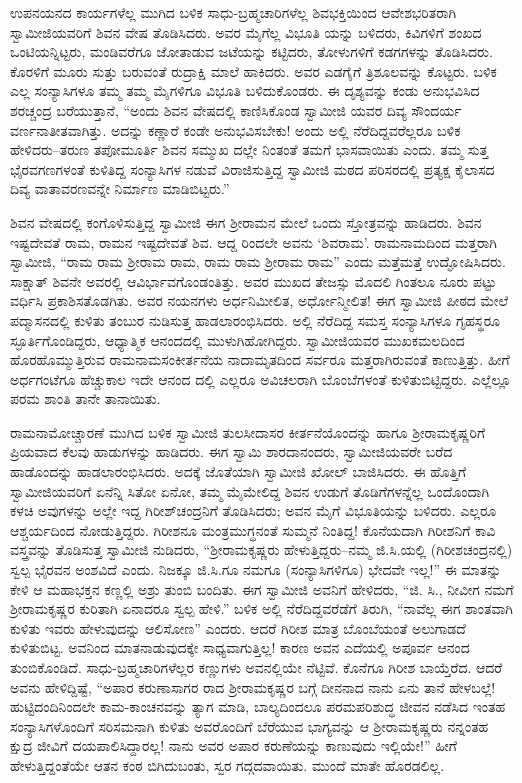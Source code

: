 ಉಪನಯನದ ಕಾರ್ಯಗಳೆಲ್ಲ ಮುಗಿದ ಬಳಿಕ ಸಾಧು-ಬ್ರಹ್ಮಚಾರಿಗಳೆಲ್ಲ ಶಿವಭಕ್ತಿಯಿಂದ ಆವೇಶಭರಿತರಾಗಿ ಸ್ವಾಮೀಜಿಯವರಿಗೆ ಶಿವನ ವೇಷ ತೊಡಿಸಿದರು. ಅವರ ಮೈಗೆಲ್ಲ ವಿಭೂತಿ ಯನ್ನು ಬಳಿದರು, ಕಿವಿಗಳಿಗೆ ಶಂಖದ ಒಂಟಿಯನ್ನಿಟ್ಟರು, ಮಂಡಿವರೆಗೂ ಜೋತಾಡುವ ಜಟೆಯನ್ನು ಕಟ್ಟಿದರು, ತೋಳುಗಳಿಗೆ ಕಡಗಗಳನ್ನು ತೊಡಿಸಿದರು. ಕೊರಳಿಗೆ ಮೂರು ಸುತ್ತು ಬರುವಂತೆ ರುದ್ರಾಕ್ಷಿ ಮಾಲೆ ಹಾಕಿದರು. ಅವರ ಎಡಗೈಗೆ ತ್ರಿಶೂಲವನ್ನು ಕೊಟ್ಟರು. ಬಳಿಕ ಎಲ್ಲ ಸಂನ್ಯಾಸಿಗಳೂ ತಮ್ಮ ತಮ್ಮ ಮೈಗಳಿಗೂ ವಿಭೂತಿ ಬಳಿದುಕೊಂಡರು. ಈ ದೃಶ್ಯವನ್ನು ಕಂಡು ಅನುಭವಿಸಿದ ಶರಚ್ಚಂದ್ರ ಬರೆಯುತ್ತಾನೆ, “ಅಂದು ಶಿವನ ವೇಷದಲ್ಲಿ ಕಾಣಿಸಿಕೊಂಡ ಸ್ವಾಮೀಜಿ ಯವರ ದಿವ್ಯ ಸೌಂದರ್ಯ ವರ್ಣನಾತೀತವಾಗಿತ್ತು. ಅದನ್ನು ಕಣ್ಣಾರೆ ಕಂಡೇ ಅನುಭವಿಸಬೇಕು! ಅಂದು ಅಲ್ಲಿ ನೆರೆದಿದ್ದವರೆಲ್ಲರೂ ಬಳಿಕ ಹೇಳಿದರು–ತರುಣ ತಪೋಮೂರ್ತಿ ಶಿವನ ಸಮ್ಮುಖ ದಲ್ಲೇ ನಿಂತಂತೆ ತಮಗೆ ಭಾಸವಾಯಿತು ಎಂದು. ತಮ್ಮ ಸುತ್ತ ಭೈರವಗಣಗಳಂತೆ ಕುಳಿತಿದ್ದ ಸಂನ್ಯಾಸಿಗಳ ನಡುವೆ ವಿರಾಜಿಸುತ್ತಿದ್ದ ಸ್ವಾಮೀಜಿ ಮಠದ ಪರಿಸರದಲ್ಲಿ ಪ್ರತ್ಯಕ್ಷ ಕೈಲಾಸದ ದಿವ್ಯ ವಾತಾವರಣವನ್ನೇ ನಿರ್ಮಾಣ ಮಾಡಿಬಿಟ್ಟರು.”

ಶಿವನ ವೇಷದಲ್ಲಿ ಕಂಗೊಳಿಸುತ್ತಿದ್ದ ಸ್ವಾಮೀಜಿ ಈಗ ಶ್ರೀರಾಮನ ಮೇಲೆ ಒಂದು ಸ್ತೋತ್ರವನ್ನು ಹಾಡಿದರು. ಶಿವನ ಇಷ್ಟದೇವತೆ ರಾಮ, ರಾಮನ ಇಷ್ಟದೇವತೆ ಶಿವ. ಆದ್ದ ರಿಂದಲೇ ಅವನು ‘ಶಿವರಾಮ’. ರಾಮನಾಮದಿಂದ ಮತ್ತರಾಗಿ ಸ್ವಾಮೀಜಿ, “ರಾಮ ರಾಮ ಶ್ರೀರಾಮ ರಾಮ, ರಾಮ ರಾಮ ಶ್ರೀರಾಮ ರಾಮ” ಎಂದು ಮತ್ತೆಮತ್ತೆ ಉದ್ಘೋಷಿಸಿದರು. ಸಾಕ್ಷಾತ್ ಶಿವನೇ ಅವರಲ್ಲಿ ಆವಿರ್ಭಾವಗೊಂಡಂತಿತ್ತು. ಅವರ ಮುಖದ ತೇಜಸ್ಸು ಮೊದಲಿ ಗಿಂತಲೂ ನೂರು ಪಟ್ಟು ವರ್ಧಿಸಿ ಪ್ರಕಾಶಿಸತೊಡಗಿತು. ಅವರ ನಯನಗಳು ಅರ್ಧನಿಮೀಲಿತ, ಅರ್ಧೋನ್ಮೀಲಿತ! ಈಗ ಸ್ವಾಮೀಜಿ ಪೀಠದ ಮೇಲೆ ಪದ್ಮಾಸನದಲ್ಲಿ ಕುಳಿತು ತಂಬುರ ನುಡಿಸುತ್ತ ಹಾಡಲಾರಂಭಿಸಿದರು. ಅಲ್ಲಿ ನೆರೆದಿದ್ದ ಸಮಸ್ತ ಸಂನ್ಯಾಸಿಗಳೂ ಗೃಹಸ್ಥರೂ ಸ್ಫೂರ್ತಿಗೊಂಡಿದ್ದರು, ಆಧ್ಯಾತ್ಮಿಕ ಆನಂದದಲ್ಲಿ ಮುಳುಗಿಹೋಗಿದ್ದರು. ಸ್ವಾಮೀಜಿಯವರ ಮುಖಕಮಲದಿಂದ ಹೊರಹೊಮ್ಮುತ್ತಿರುವ ರಾಮನಾಮಸಂಕೀರ್ತನೆಯ ನಾದಾಮೃತದಿಂದ ಸರ್ವರೂ ಮತ್ತರಾಗಿರುವಂತೆ ಕಾಣುತ್ತಿತ್ತು. ಹೀಗೆ ಅರ್ಧಗಂಟೆಗೂ ಹೆಚ್ಚುಕಾಲ ಇದೇ ಆನಂದ ದಲ್ಲಿ ಎಲ್ಲರೂ ಅವಿಚಲರಾಗಿ ಬೊಂಬೆಗಳಂತೆ ಕುಳಿತುಬಿಟ್ಟಿದ್ದರು. ಎಲ್ಲೆಲ್ಲೂ ಪರಮ ಶಾಂತಿ ತಾನೇ ತಾನಾಯಿತು.

ರಾಮನಾಮೋಚ್ಚಾರಣೆ ಮುಗಿದ ಬಳಿಕ ಸ್ವಾಮೀಜಿ ತುಲಸೀದಾಸರ ಕೀರ್ತನೆಯೊಂದನ್ನು ಹಾಗೂ ಶ್ರೀರಾಮಕೃಷ್ಣರಿಗೆ ಪ್ರಿಯವಾದ ಕೆಲವು ಹಾಡುಗಳನ್ನು ಹಾಡಿದರು. ಈಗ ಸ್ವಾಮಿ ಶಾರದಾನಂದರು, ಸ್ವಾಮೀಜಿಯವರೇ ಬರೆದ ಹಾಡೊಂದನ್ನು ಹಾಡಲಾರಂಭಿಸಿದರು. ಅದಕ್ಕೆ ಜೊತೆಯಾಗಿ ಸ್ವಾಮೀಜಿ ಖೋಲ್ ಬಾಜಿಸಿದರು. ಈ ಹೊತ್ತಿಗೆ ಸ್ವಾಮೀಜಿಯವರಿಗೆ ಏನೆನ್ನಿ ಸಿತೋ ಏನೋ, ತಮ್ಮ ಮೈಮೇಲಿದ್ದ ಶಿವನ ಉಡುಗೆ ತೊಡಿಗೆಗಳನ್ನೆಲ್ಲ ಒಂದೊಂದಾಗಿ ಕಳಚಿ ಅವುಗಳನ್ನು ಅಲ್ಲೇ ಇದ್ದ ಗಿರೀಶ್​ಚಂದ್ರನಿಗೆ ತೊಡಿಸಿದರು; ಅವನ ಮೈಗೆ ವಿಭೂತಿಯನ್ನು ಬಳಿದರು. ಎಲ್ಲರೂ ಆಶ್ಚರ್ಯದಿಂದ ನೋಡುತ್ತಿದ್ದರು. ಗಿರೀಶನೂ ಮಂತ್ರಮುಗ್ಧನಂತೆ ಸುಮ್ಮನೆ ನಿಂತಿದ್ದ! ಕೊನೆಯದಾಗಿ ಗಿರೀಶನಿಗೆ ಕಾವಿ ವಸ್ತ್ರವನ್ನು ತೊಡಿಸುತ್ತ ಸ್ವಾಮೀಜಿ ನುಡಿದರು, “ಶ್ರೀರಾಮಕೃಷ್ಣರು ಹೇಳುತ್ತಿದ್ದರು–ನಮ್ಮ ಜಿ.ಸಿ.ಯಲ್ಲಿ (ಗಿರೀಶಚಂದ್ರನಲ್ಲಿ) ಸ್ವಲ್ಪ ಭೈರವನ ಅಂಶವಿದೆ ಎಂದು. ನಿಜಕ್ಕೂ ಜಿ.ಸಿ.ಗೂ ನಮಗೂ (ಸಂನ್ಯಾಸಿಗಳಿಗೂ) ಭೇದವೇ ಇಲ್ಲ!” ಈ ಮಾತನ್ನು ಕೇಳಿ ಆ ಮಹಾಭಕ್ತನ ಕಣ್ಣಲ್ಲಿ ಅಶ್ರು ತುಂಬಿ ಬಂದಿತು. ಈಗ ಸ್ವಾಮೀಜಿ ಅವನಿಗೆ ಹೇಳಿದರು, “ಜಿ. ಸಿ., ನೀವೀಗ ನಮಗೆ ಶ್ರೀರಾಮಕೃಷ್ಣರ ಕುರಿತಾಗಿ ಏನಾದರೂ ಸ್ವಲ್ಪ ಹೇಳಿ.” ಬಳಿಕ ಅಲ್ಲಿ ನೆರೆದಿದ್ದವರೆಡೆಗೆ ತಿರುಗಿ, “ನಾವೆಲ್ಲ ಈಗ ಶಾಂತವಾಗಿ ಕುಳಿತು ಇವರು ಹೇಳುವುದನ್ನು ಆಲಿಸೋಣ” ಎಂದರು. ಆದರೆ ಗಿರೀಶ ಮಾತ್ರ ಬೊಂಬೆಯಂತೆ ಅಲುಗಾಡದೆ ಕುಳಿತುಬಿಟ್ಟ. ಅವನಿಂದ ಮಾತನಾಡುವುದಕ್ಕೇ ಸಾಧ್ಯವಾಗುತ್ತಿಲ್ಲ! ಕಾರಣ ಅವನ ಎದೆಯಲ್ಲಿ ಅಪೂರ್ವ ಆನಂದ ತುಂಬಿಕೊಂಡಿದೆ. ಸಾಧು-ಬ್ರಹ್ಮಚಾರಿಗಳೆಲ್ಲರ ಕಣ್ಣುಗಳು ಅವನಲ್ಲಿಯೇ ನೆಟ್ಟಿವೆ. ಕೊನೆಗೂ ಗಿರೀಶ ಬಾಯ್ತೆರೆದ. ಆದರೆ ಅವನು ಹೇಳಿದ್ದಿಷ್ಟೆ, “ಅಪಾರ ಕರುಣಾಸಾಗರ ರಾದ ಶ್ರೀರಾಮಕೃಷ್ಣರ ಬಗ್ಗೆ ದೀನನಾದ ನಾನು ಏನು ತಾನೆ ಹೇಳಬಲ್ಲೆ! ಹುಟ್ಟಿದಂದಿನಿಂದಲೇ ಕಾಮ-ಕಾಂಚನವನ್ನು ತ್ಯಾಗ ಮಾಡಿ, ಬಾಲ್ಯದಿಂದಲೂ ಪರಮಪರಿಶುದ್ಧ ಜೀವನ ನಡೆಸಿದ ಇಂತಹ ಸಂನ್ಯಾಸಿಗಳೊಂದಿಗೆ ಸರಿಸಮನಾಗಿ ಕುಳಿತು ಅವರೊಂದಿಗೆ ಬೆರೆಯುವ ಭಾಗ್ಯವನ್ನು ಆ ಶ್ರೀರಾಮಕೃಷ್ಣರು ನನ್ನಂತಹ ಕ್ಷುದ್ರ ಜೀವಿಗೆ ದಯಪಾಲಿಸಿದ್ದಾರಲ್ಲ! ನಾನು ಅವರ ಅಪಾರ ಕರುಣೆಯನ್ನು ಕಾಣುವುದು ಇಲ್ಲಿಯೇ!” ಹೀಗೆ ಹೇಳುತ್ತಿದ್ದಂತೆಯೇ ಆತನ ಕಂಠ ಬಿಗಿದುಬಂತು, ಸ್ವರ ಗದ್ಗದವಾಯಿತು. ಮುಂದೆ ಮಾತೇ ಹೊರಡಲಿಲ್ಲ.

